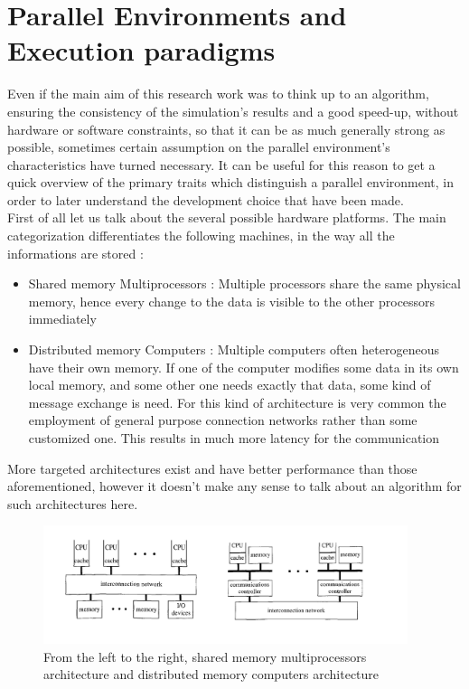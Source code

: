 \documentclass[12pt,a4paper,fleqn]{report}
\begin{document}
\section{Parallel Environments and Execution paradigms}
Even if the main aim of this research work was to think up to an algorithm, ensuring the consistency of the simulation's results and a good speed-up,  without hardware or software constraints, so that it can be as much generally strong as possible, sometimes certain assumption on the parallel environment's characteristics have turned necessary. It can be useful for this reason to get a quick overview of the primary traits which distinguish a parallel environment, in order to later understand the development choice that have been made. \\
First of all let us talk about the several possible hardware platforms. The main categorization differentiates the following machines, in the way all the informations are stored :
\begin{itemize}
\item
Shared memory Multiprocessors : Multiple processors share the same physical memory, hence every change to the data is visible to the other processors immediately
\item 
Distributed memory Computers : Multiple computers often heterogeneous have their own memory. If one of the computer modifies some data in its own local memory, and some other one needs exactly that data, some kind of message exchange is need. For this kind of architecture is very common the employment of general purpose connection networks rather than some customized one. This results in much more latency for the communication
\end{itemize}
More targeted architectures exist and have better performance than those aforementioned, however it doesn't make any sense to talk about an algorithm for such architectures here.
\newpage
\begin{figure}[ht!]
\centering
    \includegraphics[width=0.95\textwidth]{parallel_architectures}
    \caption{  From the left to the right, shared memory multiprocessors architecture and distributed memory computers architecture \cite{0}}
\end{figure}
\end{document}
